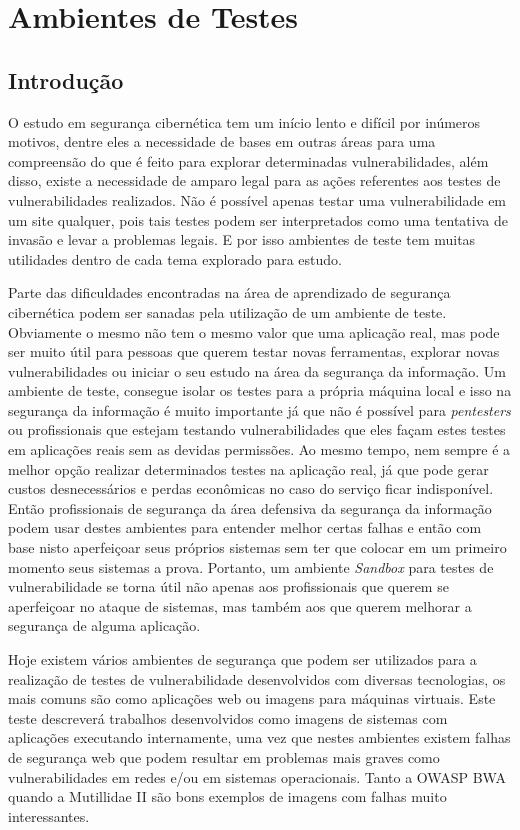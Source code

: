 \chapter{Ambientes de Testes}

\section{Introdução}

O estudo em segurança cibernética tem um início lento e difícil por inúmeros motivos, dentre eles a necessidade de bases em outras áreas para uma compreensão do que é feito para explorar determinadas vulnerabilidades, além disso, existe a necessidade de amparo legal para as ações referentes aos testes de vulnerabilidades realizados. Não é possível apenas testar uma vulnerabilidade em um site qualquer, pois tais testes podem ser interpretados como uma tentativa de invasão e levar a problemas legais. E por isso ambientes de teste tem muitas utilidades dentro de cada tema explorado para estudo.

Parte das dificuldades encontradas na área de aprendizado de segurança cibernética podem ser sanadas pela utilização de um ambiente de teste. Obviamente o mesmo não tem o mesmo valor que uma aplicação real, mas pode ser muito útil para pessoas que querem testar novas ferramentas, explorar novas vulnerabilidades ou iniciar o seu estudo na área da segurança da informação. Um ambiente de teste, consegue isolar os testes para a própria máquina local e isso na segurança da informação é muito importante já que não é possível para \textit{pentesters} ou profissionais que estejam testando vulnerabilidades que eles façam estes testes em aplicações reais sem as devidas permissões. Ao mesmo tempo, nem sempre é a melhor opção realizar determinados testes na aplicação real, já que pode gerar custos desnecessários e perdas econômicas no caso do serviço ficar indisponível. Então profissionais de segurança da área defensiva da segurança da informação podem usar destes ambientes para entender melhor certas falhas e então com base nisto aperfeiçoar seus próprios sistemas sem ter que colocar em um primeiro momento seus sistemas a prova. Portanto, um ambiente \textit{Sandbox} para testes de vulnerabilidade se torna útil não apenas aos profissionais que querem se aperfeiçoar no ataque de sistemas, mas também aos que querem melhorar a segurança de alguma aplicação. 


Hoje existem vários ambientes de segurança que podem ser utilizados para a realização de testes de vulnerabilidade desenvolvidos com diversas tecnologias, os mais comuns são como aplicações web ou imagens para máquinas virtuais. Este teste descreverá trabalhos desenvolvidos como imagens de sistemas com aplicações executando internamente, uma vez que nestes ambientes existem falhas de segurança web que podem resultar em problemas mais graves como vulnerabilidades em redes e/ou em sistemas operacionais. Tanto a OWASP BWA quando a Mutillidae II são bons exemplos de imagens com falhas muito interessantes.


